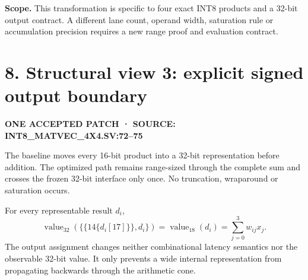 \documentclass[10pt,a4paper]{article}
\newcommand{\smallcaps}[1]{\textcolor{Mid}{\fontsize{8.5}{10}\selectfont\bfseries\MakeUppercase{#1}}}
\newcommand{\newpageheading}[2]{\clearpage\section{#1}\smallcaps{#2}\vspace{6pt}}
\begin{document}
\begin{scopebox}
\textbf{Scope.} This transformation is specific to four exact INT8 products and a 32-bit output contract. A different lane count, operand width, saturation rule or accumulation precision requires a new range proof and evaluation contract.
\end{scopebox}

\newpageheading{8. Structural view 3: explicit signed output boundary}{One accepted patch · source: int8\_matvec\_4x4.sv:72--75}

The baseline moves every 16-bit product into a 32-bit representation before addition. The optimized path remains range-sized through the complete sum and crosses the frozen 32-bit interface only once. No truncation, wraparound or saturation occurs.

\begin{center}
\end{center}

For every representable result $d_i$,
\[
\operatorname{value}_{32}\!\left(\{\{14\{d_i[17]\}\},d_i\}\right)
=\operatorname{value}_{18}(d_i)
=\sum_{j=0}^{3}w_{ij}x_j.
\]
The output assignment changes neither combinational latency semantics nor the observable 32-bit value. It only prevents a wide internal representation from propagating backwards through the arithmetic cone.
\end{document}
